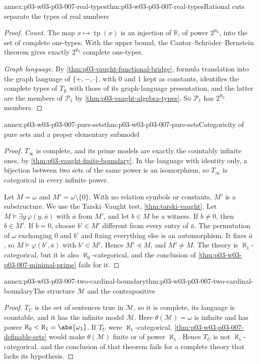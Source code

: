 \begin{annexitem}{annex:p03-w03-p03-007-real-types}{thm:p03-w03-p03-007-real-types}{Rational cuts separate the types of real numbers}
\begin{proof}
\emph{Count.} The map \(x\mapsto\operatorname{tp}(x)\) is an injection of
\(\mathbb R\), of power \(2^{\aleph_0}\), into the set of complete
one-types. With the upper bound, the Cantor--Schr\"oder--Bernstein theorem
gives exactly \(2^{\aleph_0}\) complete one-types.

\emph{Graph language.} By \cref{thm:p03-vaught-functional-bridge}, formula
translation into the graph language of \(\{+,-,\cdot\}\), with \(0\) and
\(1\) kept as constants, identifies the complete types of \(T_{\mathbb R}\)
with those of its graph-language presentation, and the latter are the
members of \(\mathcal P_1\) by \cref{thm:p03-vaught-algebra-types}. So
\(\mathcal P_1\) has \(2^{\aleph_0}\) members.
\end{proof}
\end{annexitem}

\begin{annexitem}{annex:p03-w03-p03-007-pure-sets}{thm:p03-w03-p03-007-pure-sets}{Categoricity of pure sets and a proper elementary submodel}
\begin{proof}
\(T_\infty\) is complete, and its prime models are exactly the countably
infinite ones, by \cref{thm:p03-vaught-finite-boundary}. In the language
with identity only, a bijection between two sets of the same power is an
isomorphism, so \(T_\infty\) is categorical in every infinite power.

Let \(M=\omega\) and \(M'=\omega\setminus\{0\}\). With no relation symbols or
constants, \(M'\) is a substructure. We use the Tarski--Vaught test,
\cref{thm:tarski-vaught}. Let \(M\models\exists y\,\varphi(y,\bar a)\) with
\(\bar a\) from \(M'\), and let \(b\in M\) be a witness. If \(b\neq0\), then
\(b\in M'\). If \(b=0\), choose \(b'\in M'\) different from every entry of
\(\bar a\). The permutation of \(\omega\) exchanging \(0\) and \(b'\) and
fixing everything else is an automorphism. It fixes \(\bar a\), so
\(M\models\varphi(b',\bar a)\) with \(b'\in M'\). Hence \(M'\preccurlyeq M\),
and \(M'\neq M\). The theory is \(\aleph_1\)-categorical, but it is also
\(\aleph_0\)-categorical, and the conclusion of
\cref{thm:p03-w03-p03-007-minimal-prime} fails for it.
\end{proof}
\end{annexitem}

\begin{annexitem}{annex:p03-w03-p03-007-two-cardinal-boundary}{thm:p03-w03-p03-007-two-cardinal-boundary}{The structure \(\mathcal M\) and the contrapositive}
\begin{proof}
\(T_U\) is the set of sentences true in \(\mathcal M\), so it is complete,
its language is countable, and it has the infinite model \(\mathcal M\). Here
\(\theta(\mathcal M)=\omega\) is infinite and has power
\(\aleph_0<\aleph_1=\abs{\omega_1}\). If \(T_U\) were \(\aleph_1\)-categorical,
\cref{thm:p03-w03-p03-007-definable-sets} would make \(\theta(\mathcal M)\)
finite or of power \(\aleph_1\). Hence \(T_U\) is not
\(\aleph_1\)-categorical, and the conclusion of that theorem fails for a
complete theory that lacks its hypothesis.
\end{proof}
\end{annexitem}
